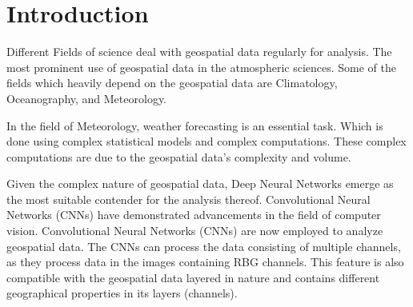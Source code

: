 \clearpage
\cleardoublepage

\chapter{Introduction}

Different Fields of science deal with geospatial data regularly for analysis.
The most prominent use of geospatial data in the atmospheric sciences. Some of the fields
which heavily depend on the geospatial data are Climatology, Oceanography, and Meteorology.

In the field of Meteorology, weather forecasting is an essential task. Which is done using complex statistical models and complex computations.
These complex computations are due to the geospatial data's
complexity and volume.

Given the complex nature of geospatial data,
Deep Neural Networks emerge as the most suitable contender for the analysis thereof. Convolutional Neural Networks (CNNs) have demonstrated advancements in the field of computer
vision. Convolutional Neural Networks (CNNs) are now employed to analyze geospatial data. The CNNs can process the data consisting of multiple channels, as they process
data in the images containing RBG channels. This feature is also compatible with the geospatial data layered in nature and contains different geographical properties in its layers
(channels).

